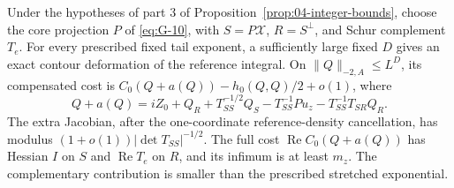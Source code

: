 \begin{lemma}\label{lem:04-contour}\label{E:particle-transport}
Under the hypotheses of part 3 of
Proposition~\ref{prop:04-integer-bounds},
choose the core projection \(P\) of \eqref{eq:G-10}, with
\(S=P\mathcal X\), \(R=S^\perp\), and Schur complement \(T_e\).
For every prescribed fixed tail exponent, a sufficiently large fixed
\(D\) gives an exact contour deformation of the reference integral.
On \(\|Q\|_{-2,A}\le L^D\), its compensated cost is
\(C_0(Q+a(Q))-h_0(Q,Q)/2+o(1)\), where
\[
 Q+a(Q)=iZ_0+Q_R+T_{SS}^{-1/2}Q_S
             -T_{SS}^{-1}Pu_z-T_{SS}^{-1}T_{SR}Q_R.
\]
The extra Jacobian, after the one-coordinate reference-density
cancellation, has modulus
\((1+o(1))|\det T_{SS}|^{-1/2}\). The full cost \(\operatorname{Re}C_0(Q+a(Q))\) has Hessian
\(I\) on \(S\) and \(\operatorname{Re}T_e\) on \(R\), and its
infimum is at least \(m_z\). The complementary contribution is smaller
than the prescribed stretched exponential.
\end{lemma}

